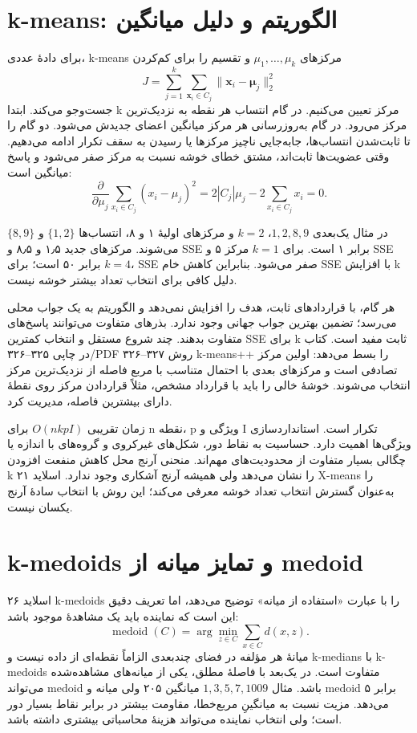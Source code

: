 \section{k-means: الگوریتم و دلیل میانگین}

برای دادهٔ عددی، k-means مرکزهای \(\mu_1,\ldots,\mu_k\) و تقسیم را برای کم‌کردن \[
J=\sum_{j=1}^k\sum_{\boldsymbol x_i\in C_j}\|\boldsymbol x_i-\boldsymbol\mu_j\|_2^2
\] جست‌وجو می‌کند. ابتدا k مرکز تعیین می‌کنیم. در گام انتساب هر نقطه به نزدیک‌ترین مرکز می‌رود. در گام به‌روزرسانی هر مرکز میانگین اعضای جدیدش می‌شود. دو گام را تا ثابت‌شدن انتساب‌ها، جابه‌جایی ناچیز مرکزها یا رسیدن به سقف تکرار ادامه می‌دهیم. وقتی عضویت‌ها ثابت‌اند، مشتق خطای خوشه نسبت به مرکز صفر می‌شود و پاسخ میانگین است: \[
\frac{\partial}{\partial\mu_j}\sum_{x_i\in C_j}(x_i-\mu_j)^2=2|C_j|\mu_j-2\sum_{x_i\in C_j}x_i=0.
\]

در مثال یک‌بعدی \(1,2,8,9\)، $k=2$ و مرکزهای اولیهٔ ۱ و ۸، انتساب‌ها \(\{1,2\}\) و \(\{8,9\}\) می‌شوند. مرکزهای جدید ۱٫۵ و ۸٫۵ و SSE برابر ۱ است. برای $k=1$ مرکز ۵ و SSE برابر ۵۰ است؛ برای $k=4$، SSE صفر می‌شود. بنابراین کاهش خام SSE با افزایش k دلیل کافی برای انتخاب تعداد بیشتر خوشه نیست.

هر گام، با قراردادهای ثابت، هدف را افزایش نمی‌دهد و الگوریتم به یک جواب محلی می‌رسد؛ تضمین بهترین جواب جهانی وجود ندارد. بذرهای متفاوت می‌توانند پاسخ‌های متفاوت بدهند. چند شروع مستقل و انتخاب کمترین SSE برای k ثابت مفید است. کتاب در چاپی ۳۲۵--۳۲۶/PDF ۳۲۶--۳۲۷ روش k-means++ را بسط می‌دهد: اولین مرکز تصادفی است و مرکزهای بعدی با احتمال متناسب با مربع فاصله از نزدیک‌ترین مرکز انتخاب می‌شوند. خوشهٔ خالی را باید با قرارداد مشخص، مثلاً قراردادن مرکز روی نقطهٔ دارای بیشترین فاصله، مدیریت کرد.

زمان تقریبی \(O(nkpI)\) برای n نقطه، p ویژگی و I تکرار است. استانداردسازی ویژگی‌ها اهمیت دارد. حساسیت به نقاط دور، شکل‌های غیرکروی و گروه‌های با اندازه یا چگالی بسیار متفاوت از محدودیت‌های مهم‌اند. منحنی آرنج محل کاهش منفعت افزودن k را نشان می‌دهد ولی همیشه آرنج آشکاری وجود ندارد. اسلاید ۲۱ X-means را به‌عنوان گسترش انتخاب تعداد خوشه معرفی می‌کند؛ این روش با انتخاب سادهٔ آرنج یکسان نیست.

\section{k-medoids و تمایز میانه از medoid}

اسلاید ۲۶ k-medoids را با عبارت «استفاده از میانه» توضیح می‌دهد، اما تعریف دقیق این است که نماینده باید یک مشاهدهٔ موجود باشد: \[
\operatorname{medoid}(C)=\arg\min_{z\in C}\sum_{x\in C}d(x,z).
\] میانهٔ هر مؤلفه در فضای چندبعدی الزاماً نقطه‌ای از داده نیست و k-medians با k-medoids متفاوت است. در یک‌بعد با فاصلهٔ مطلق، یکی از میانه‌های مشاهده‌شده می‌تواند medoid باشد. مثال \(1,3,5,7,1009\) میانگین ۲۰۵ ولی میانه و medoid برابر ۵ می‌دهد. مزیت نسبت به میانگینِ مربع‌خطا، مقاومت بیشتر در برابر نقاط بسیار دور است؛ ولی انتخاب نماینده می‌تواند هزینهٔ محاسباتی بیشتری داشته باشد.

